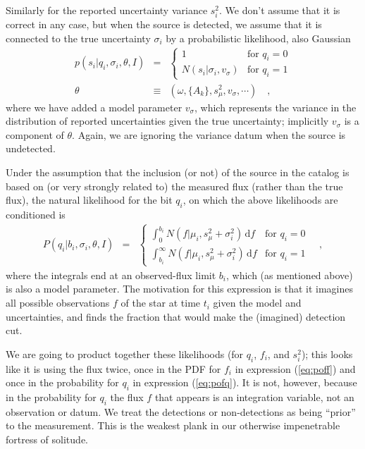 \documentclass[12pt]{article}
\newcommand{\dd}{\mathrm{d}}
\begin{document}
Similarly for the reported uncertainty variance $s_i^2$.  We don't
assume that it is correct in any case, but when the source is
detected, we assume that it is connected to the true uncertainty
$\sigma_i$ by a probabilistic likelihood, also Gaussian
\begin{eqnarray}\displaystyle
p(s_i|q_i,\sigma_i,\theta,I) &=& \left\{\begin{array}{ll}
  1 & \mbox{for $q_i=0$} \\
  N(s_i|\sigma_i,v_\sigma) & \mbox{for $q_i=1$}
\end{array}\right.
\\
\theta &\equiv& (\omega, \{A_k\}, s_\mu^2, v_\sigma, \cdots)
\quad ,
\end{eqnarray}
where we have added a model parameter $v_\sigma$, which represents the
variance in the distribution of reported uncertainties given the true
uncertainty; implicitly $v_\sigma$ is a component of $\theta$.  Again,
we are ignoring the variance datum when the source is undetected.

Under the assumption that the inclusion (or not) of the source in the
catalog is based on (or very strongly related to) the measured flux
(rather than the true flux), the natural likelihood for the bit $q_i$,
on which the above likelihoods are conditioned is
\begin{eqnarray}\displaystyle
P(q_i|b_i,\sigma_i,\theta,I) &=& \left\{\begin{array}{ll}
  \displaystyle\int_0^{b_i} N(f|\mu_i,s_\mu^2+\sigma_i^2)\,\dd f & \mbox{for $q_i=0$} \\
  \displaystyle\int_{b_i}^\infty N(f|\mu_i,s_\mu^2+\sigma_i^2)\,\dd f & \mbox{for $q_i=1$}
\end{array}\right.\label{eq:pofq}
\quad,
\end{eqnarray}
where the integrals end at an observed-flux limit $b_i$, which (as
mentioned above) is also a model parameter.  The motivation for this
expression is that it imagines all possible observations $f$ of the
star at time $t_i$ given the model and uncertainties, and finds the
fraction that would make the (imagined) detection cut.

We are going to product together these likelihoods (for $q_i$, $f_i$,
and $s_i^2$); this looks like it is using the flux twice, once in the
PDF for $f_i$ in expression (\ref{eq:poff}) and once in the
probability for $q_i$ in expression (\ref{eq:pofq}).  It is not,
however, because in the probability for $q_i$ the flux $f$ that
appears is an integration variable, not an observation or datum.  We
treat the detections or non-detections as being ``prior'' to the
measurement.  This is the weakest plank in our otherwise impenetrable
fortress of solitude.
\end{document}
